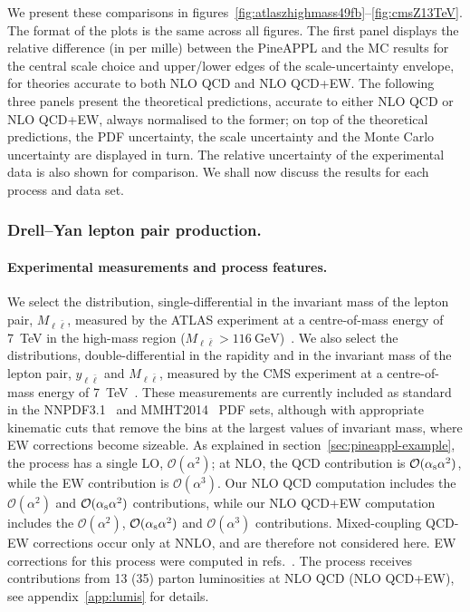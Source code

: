 We present these comparisons in
figures~\ref{fig:atlaszhighmass49fb}--\ref{fig:cmsZ13TeV}.
The format of the plots is the same across all figures. The first panel
displays the relative difference (in per mille) between the {\sc PineAPPL} and
the MC results for the central scale choice and upper/lower edges of the
scale-uncertainty envelope, for
theories accurate to both NLO QCD and NLO QCD+EW. The following three panels
present the theoretical predictions, accurate to either NLO QCD or NLO QCD+EW,
always normalised to the former; on top of the theoretical predictions, the
PDF uncertainty, the scale uncertainty and the Monte Carlo uncertainty are
displayed in turn. The relative uncertainty of the experimental data is
also shown for comparison. We shall now discuss the results for each
process and data set.

\subsubsection{Drell--Yan lepton pair production.}
\label{sec:dy-lepton-pair-production}

\paragraph{Experimental measurements and process features.}
We select the distribution, single-differential in the invariant mass of the
lepton pair, $M_{\ell \bar\ell}$, measured by the ATLAS experiment at a centre-of-mass
energy of \SI{7}{\tera\electronvolt} in the high-mass region
($M_{\ell\bar\ell}>\SI{116}{\giga\electronvolt}$)~\cite{Aad:2013iua}.
We also select the distributions, double-differential in the rapidity and in
the invariant mass of the lepton pair, $y_{\ell\bar\ell}$ and $M_{\ell\bar\ell}$,
measured by the CMS experiment at a centre-of-mass energy of
\SI{7}{\tera\electronvolt}~\cite{Chatrchyan:2013tia}.
These measurements are currently included as standard in the
NNPDF3.1~\cite{Ball:2017nwa} and MMHT2014~\cite{Harland-Lang:2014zoa} PDF sets,
although with appropriate kinematic cuts that remove the bins at the largest
values of invariant mass, where EW corrections become sizeable. As explained in
section~\ref{sec:pineappl-example}, 
the process has a single LO, $\mathcal{O}(\alpha^2)$; at NLO, the
QCD contribution is $\mathcal{O}(\alpha_\mathrm{s}\alpha^2)$, while the EW contribution
is $\mathcal{O}(\alpha^3)$. Our NLO QCD computation includes the
$\mathcal{O}(\alpha^2)$ and $\mathcal{O}(\alpha_\mathrm{s}\alpha^2)$ contributions, while
our NLO QCD+EW computation includes the $\mathcal{O}(\alpha^2)$, 
$\mathcal{O}(\alpha_\mathrm{s}\alpha^2)$ and $\mathcal{O}(\alpha^3)$ contributions.
Mixed-coupling QCD-EW corrections occur only at NNLO, and are therefore not
considered here. EW corrections for this process were computed in
refs.~\cite{Baur:2001ze,Dittmaier:2009cr}. The process receives contributions
from 13 (35) parton luminosities at NLO QCD (NLO QCD+EW),
see appendix~\ref{app:lumis} for details.

